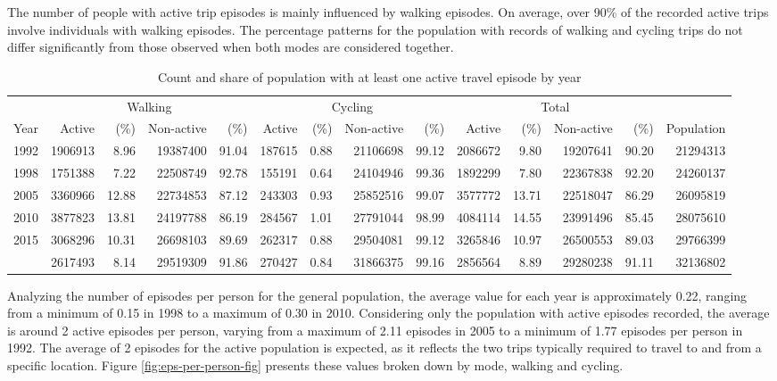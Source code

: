\documentclass[preprint, 3p,
authoryear]{elsarticle} %
\begin{document}
The number of people with active trip episodes is mainly influenced by
walking episodes. On average, over 90\% of the recorded active trips
involve individuals with walking episodes. The percentage patterns for
the population with records of walking and cycling trips do not differ
significantly from those observed when both modes are considered
together.

\begingroup\fontsize{6}{8}\selectfont

\begin{longtable}[t]{rrrrrrrrrrrrrr}
\caption{\label{tab:active_pop_proportion_table}\label{tab:active-pop-proportion-table}Count and share of population with at least one active travel episode by year}\\
\toprule
\multicolumn{1}{c}{ } & \multicolumn{4}{c}{Walking} & \multicolumn{4}{c}{Cycling} & \multicolumn{4}{c}{Total} \\
\cmidrule(l{3pt}r{3pt}){2-5} \cmidrule(l{3pt}r{3pt}){6-9} \cmidrule(l{3pt}r{3pt}){10-13}
Year & Active & (\%) & Non-active & (\%) & Active & (\%) & Non-active & (\%) & Active & (\%) & Non-active & (\%) & Population\\
\midrule
1992 & 1906913 & 8.96 & 19387400 & 91.04 & 187615 & 0.88 & 21106698 & 99.12 & 2086672 & 9.80 & 19207641 & 90.20 & 21294313\\
1998 & 1751388 & 7.22 & 22508749 & 92.78 & 155191 & 0.64 & 24104946 & 99.36 & 1892299 & 7.80 & 22367838 & 92.20 & 24260137\\
2005 & 3360966 & 12.88 & 22734853 & 87.12 & 243303 & 0.93 & 25852516 & 99.07 & 3577772 & 13.71 & 22518047 & 86.29 & 26095819\\
2010 & 3877823 & 13.81 & 24197788 & 86.19 & 284567 & 1.01 & 27791044 & 98.99 & 4084114 & 14.55 & 23991496 & 85.45 & 28075610\\
2015 & 3068296 & 10.31 & 26698103 & 89.69 & 262317 & 0.88 & 29504081 & 99.12 & 3265846 & 10.97 & 26500553 & 89.03 & 29766399\\
\addlinespace
2022 & 2617493 & 8.14 & 29519309 & 91.86 & 270427 & 0.84 & 31866375 & 99.16 & 2856564 & 8.89 & 29280238 & 91.11 & 32136802\\
\bottomrule
\end{longtable}
\endgroup{}

Analyzing the number of episodes per person for the general population,
the average value for each year is approximately 0.22, ranging from a
minimum of 0.15 in 1998 to a maximum of 0.30 in 2010. Considering only
the population with active episodes recorded, the average is around 2
active episodes per person, varying from a maximum of 2.11 episodes in
2005 to a minimum of 1.77 episodes per person in 1992. The average of 2
episodes for the active population is expected, as it reflects the two
trips typically required to travel to and from a specific location.
Figure \ref{fig:eps-per-person-fig} presents these values broken down by
mode, walking and cycling.
\end{document}
